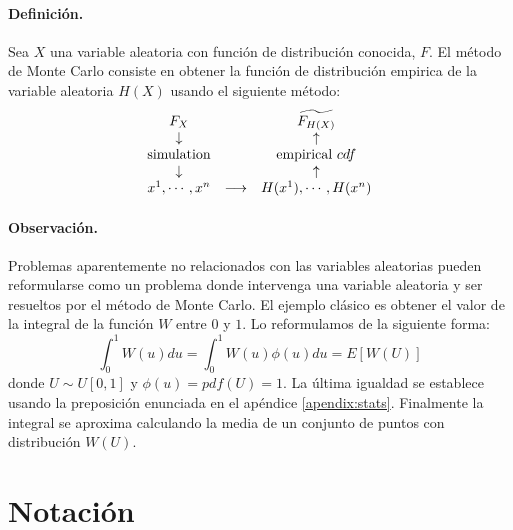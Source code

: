 \paragraph{Definici\'on.} Sea $X$ una variable aleatoria con funci\'on de 
distribuci\'on conocida, $F$. El m\'etodo de Monte Carlo consiste en 
obtener la funci\'on de distribuci\'on empirica de la variable aleatoria 
$H(X)$ usando el siguiente m\'etodo:
\begin{displaymath}
\begin{array}{ccc}
F_X                  &     \quad         & \widetilde{F_{H(X)}}   \cr
\downarrow         &     \quad         & \uparrow                \cr
\textrm{simulation} &     \quad         & \textrm{empirical } cdf \cr
\downarrow         &     \quad         & \uparrow                \cr
x^1,\cdots,x^n      & \longrightarrow & H(x^1),\cdots,H(x^n)  
\end{array}
\end{displaymath}

\paragraph{Observaci\'on.} Problemas aparentemente no relacionados con las 
variables aleatorias pueden reformularse como un problema donde intervenga
una variable aleatoria y ser resueltos por el m\'etodo de Monte Carlo. El 
ejemplo cl\'asico es obtener el valor de la integral de la funci\'on $W$ entre 
$0$ y $1$. Lo reformulamos de la siguiente forma:
\begin{displaymath}
\int_{0}^{1} W(u) du = \int_{0}^{1} W(u) \phi(u) du = E[W(U)]
\end{displaymath}
donde $U \sim U[0,1]$ y $\phi(u) = pdf(U) = 1$. La \'ultima igualdad se establece 
usando la preposici\'on enunciada en el ap\'endice \ref{apendix:stats}. 
Finalmente la integral se aproxima calculando la media de un conjunto de puntos 
con distribuci\'on $W(U)$.



\section{Notaci\'on}

